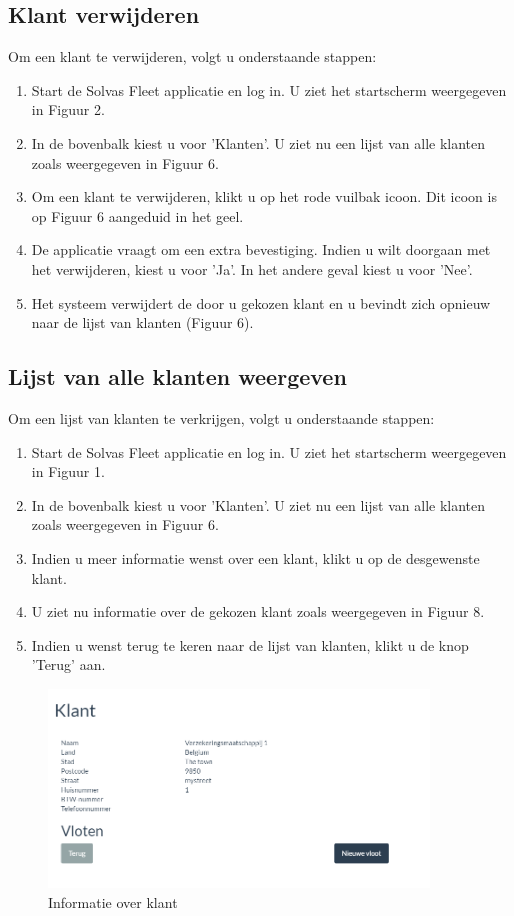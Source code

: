\documentclass[11pt,openany]{article}
\begin{document}
\subsection{Klant verwijderen}
Om een klant te verwijderen, volgt u onderstaande stappen:
\begin{enumerate}
	\item Start de Solvas Fleet applicatie en log in. U ziet het startscherm weergegeven in Figuur 2.
	\item In de bovenbalk kiest u voor 'Klanten'. U ziet nu een lijst van alle klanten zoals weergegeven in Figuur 6.
	\item Om een klant te verwijderen, klikt u op het rode vuilbak icoon. Dit icoon is op Figuur 6 aangeduid in het geel.
	\item De applicatie vraagt om een extra bevestiging. Indien u wilt doorgaan met het verwijderen, kiest u voor 'Ja'. In het andere geval kiest u voor 'Nee'.
	\item Het systeem verwijdert de door u gekozen klant en u bevindt zich opnieuw naar de lijst van klanten (Figuur 6).
\end{enumerate}

\subsection{Lijst van alle klanten weergeven}
Om een lijst van klanten te verkrijgen, volgt u onderstaande stappen:
\begin{enumerate}
	\item Start de Solvas Fleet applicatie en log in. U ziet het startscherm weergegeven in Figuur 1.
	\item In de bovenbalk kiest u voor 'Klanten'. U ziet nu een lijst van alle klanten zoals weergegeven in Figuur 6.
	\item Indien u meer informatie wenst over een klant, klikt u op de desgewenste klant. 
	\item U ziet nu informatie over de gekozen klant zoals weergegeven in Figuur 8. 
	\item Indien u wenst terug te keren naar de lijst van klanten, klikt u de knop 'Terug' aan.
\end{enumerate}

\begin{figure}
	\centering
	\includegraphics[width=0.9\textwidth]{img/fig_h.png}
	\caption{Informatie over klant}
\end{figure}
\newpage
\end{document}
